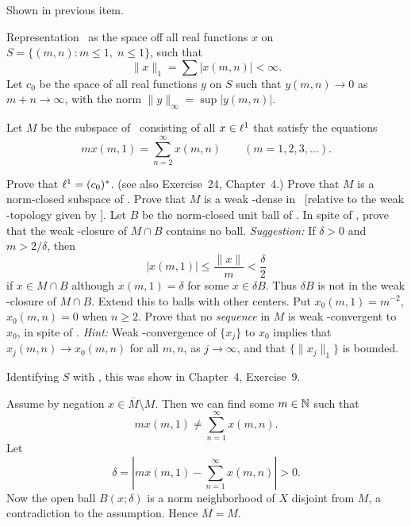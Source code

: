 \begin{enumerate}
\begin{itemize}
Shown in previous item.
\end{itemize}

\begin{excopy}
Representation \ellone\ as the space off all real functions $x$ on
\(S = \{(m,n): m\leq 1,\; n \leq 1\}\), such that
\begin{equation*}
\|x\|_1 = \sum |x(m,n)| < \infty.
\end{equation*}
Let \(c_0\) be the space of all real functions $y$ on $S$ such that
\(y(m,n) \to 0\) as \(m+n\to\infty\),
with the norm \(\|y\|_\infty = \sup |y(m,n)|\).

Let $M$ be the subspace of \ellone\ consisting of all \(x\in\ell^1\)
that satisfy the equations
\begin{equation*}
mx(m, 1) = \sum_{n=2}^\infty x(m,n) \qquad (m=1,2,3,\ldots).
\end{equation*}
\begin{itemize}
Prove that \(\ell^1 = (c_0)^*\). (see also Exercise~24, Chapter~4.)
Prove that $M$ is a norm-closed subspace of \ellone.
Prove that $M$ is a weak \upstar-dense in \ellone\ [relative to the
weak \upstar-topology given by ].
Let $B$ be the norm-closed unit ball of \ellone. In spite of ,
prove that the weak \upstar-closure of \(M\cap B\) contains no ball.
\emph{Suggestion:} If \(\delta>0\) and \(m > 2/\delta\), then
\begin{equation*}
|x(m,1)| \leq \frac{\|x\|}{m} < \frac{\delta}{2}
\end{equation*}
if \(x\in M \cap B\) although  \(x(m,1) = \delta\) for some \(x\in \delta B\).
Thus \(\delta B\) is not in the weak \upstar-closure of \(M\cap B\).
Extend this to balls with other centers.
Put \(x_0(m,1) = m^{-2}\), \(x_0(m,n)=0\) when \(n\geq 2\).
Prove that no \emph{sequence} in $M$ is weak \upstar-convergent to \(x_0\),
in spite of .
\emph{Hint:} Weak \hbox{\upstar-convergence} of
\(\{x_j\}\) to \(x_0\) implies
that \mbox{\(x_j(m,n)\to x_0(m,n)\)} for all \(m,n\), as \(j\to\infty\),
and that \(\{\|x_j\|_1\}\) is bounded.
\end{itemize}
\end{excopy}
\begin{itemize}

Identifying $S$ with \N, this was show in \cite{RudinRCA87} Chapter~4,
Exercise~9.

Assume by negation \(x \in \overline{M}\setminus M\).
Then we can find some \(m\in\mathbb{N}\) such that
\begin{equation*}
mx(m, 1) \neq \sum_{n=1}^\infty x(m,n).
\end{equation*}
Let
\begin{equation*}
\delta = \left| mx(m, 1) - \sum_{n=1}^\infty x(m,n) \right| > 0.
\end{equation*}
Now the open ball \(B(x;\delta)\) is a norm neighborhood of $X$
disjoint from $M$, a contradiction to the assumption.
Hence \(\overline{M} = M\).


\end{itemize}
\end{enumerate}
